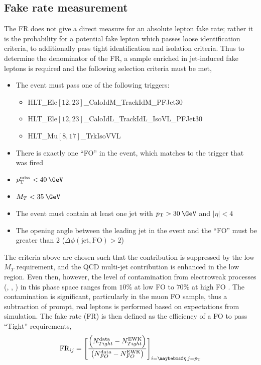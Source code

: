 \subsection{Fake rate measurement}
\label{subsec:fr_measure}
The FR does not give a direct measure for an absolute lepton fake rate; rather it is the probability for a potential fake lepton which passes loose identification criteria, to additionally pass tight identification and isolation criteria. Thus to determine the denominator of the FR, a sample enriched in jet-induced fake leptons is required and the following selection criteria must be met,
\begin{itemize}
\item The event must pass one of the following triggers:
  \begin{itemize}
  \item HLT\_Ele$[12, 23]$\_CaloIdM\_TrackIdM\_PFJet30
  \item HLT\_Ele$[12, 23]$\_CaloIdL\_TrackIdL\_IsoVL\_PFJet30
  \item HLT\_Mu$[8, 17]$\_TrkIsoVVL
  \end{itemize}
\item There is exactly one ``FO'' in the event, which matches to the trigger that was fired
\item $\MET<40\:\GeV$
\item $M_{T}<35\:\GeV$
\item The event must contain at least one jet with $\pt>30\:\GeV$ and $|\eta|<4$
\item The opening angle  between the leading jet in the event and the ``FO'' must be greater than 2 ($\Delta\phi(\text{jet},\text{FO})>2$)
\end{itemize}
The criteria above are chosen such that the \Wjets contribution is suppressed by the low $M_{T}$ requirement, and the QCD multi-jet contribution is enhanced in the low \MET region. Even then, however, the level of contamination from electroweak processes (\Wjets, \Zjets, \ttbar) in this phase space ranges from $10\%$ at low FO \pt to $70\%$ at high FO \pt. The contamination is significant, particularly in the muon FO sample, thus a subtraction of prompt, real leptons is performed based on expectations from simulation. The fake rate (FR) is then defined as the efficiency of a FO to pass ``Tight'' requirements,
\begin{equation}
  \text{FR}_{ij} = \Bigg[\frac{\left(N^{\text{data}}_{Tight} - N^{\text{EWK}}_{Tight}\right)}{\left(N^{\text{data}}_{FO} - N^{\text{EWK}}_{FO}\right)}\Bigg]_{i=\eta\,j=\pt}
\end{equation}
